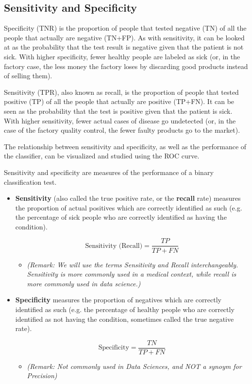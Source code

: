 \documentclass[]{report}
\begin{document}
\subsection*{Sensitivity and Specificity}
Specificity (TNR) is the proportion of people that tested negative (TN) of all the people that actually are negative (TN+FP). As with sensitivity, it can be looked at as the probability that the test result is negative given that the patient is not sick. With higher specificity, fewer healthy people are labeled as sick (or, in the factory case, the less money the factory loses by discarding good products instead of selling them).

Sensitivity (TPR), also known as recall, is the proportion of people that tested positive (TP) of all the people that actually are positive (TP+FN). It can be seen as the probability that the test is positive given that the patient is sick. With higher sensitivity, fewer actual cases of disease go undetected (or, in the case of the factory quality control, the fewer faulty products go to the market).

The relationship between sensitivity and specificity, as well as the performance of the classifier, can be visualized and studied using the ROC curve.

\medskip

Sensitivity and specificity are measures of the performance of a binary classification
test.
\begin{itemize}
\item \textbf{Sensitivity} (also called the true positive rate, or the \textbf{recall} rate) measures
the proportion of actual positives which are correctly identified
as such (e.g. the percentage of sick people who are correctly identified
as having the condition).

\[ \mbox{Sensitivity (Recall)} = \frac{TP}{TP +FN}\]

\begin{itemize}
	\item \textit{(Remark: We will use the terms Sensitivity and Recall interchangeably.
	Sensitivity is more commonly used in a medical context, while recall is more
	commonly used in data science.)}
\end{itemize}
\item \textbf{Specificity} measures the proportion of negatives which are correctly
identified as such (e.g. the percentage of healthy people who are correctly
identified as not having the condition, sometimes called the true
negative rate).

\[ \mbox{Specificity} = \frac{TN}{TP +FN}\]

\begin{itemize}
	\item \textit{(Remark: Not commonly used in Data Sciences, and NOT a synoym for Precision)}
\end{itemize}
\end{itemize}
\end{document}
